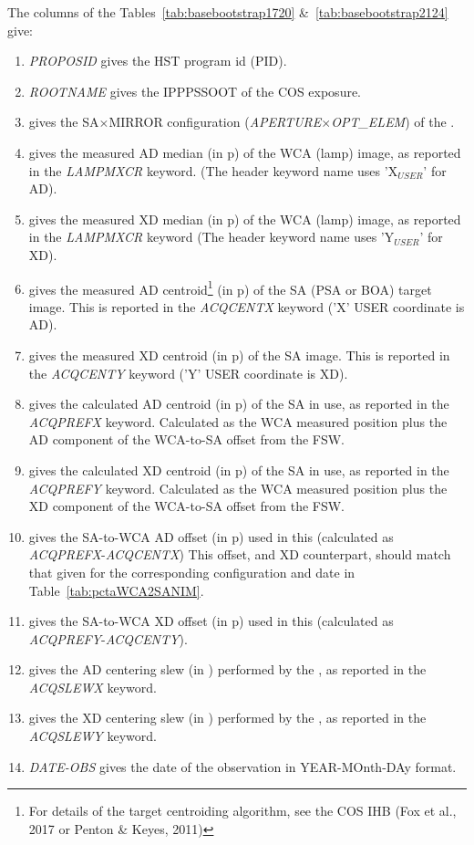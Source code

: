The columns of the Tables~\ref{tab:basebootstrap1720} \&~\ref{tab:basebootstrap2124} give:
\footnotesize
\begin{enumerate}
\item \textit{PROPOSID} gives the HST program id (PID).
\item \textit{ROOTNAME} gives the IPPPSSOOT of the COS exposure.
\item gives the SA$\times$MIRROR configuration (\textit{APERTURE}$\times$\textit{OPT\_ELEM}) of the .
\item gives the measured AD median (in p) of the WCA (lamp) image, as reported in the  \textit{LAMPMXCR} keyword.
(The header keyword name uses 'X$_{USER}$' for AD).
\item gives the measured XD median (in p) of the WCA (lamp) image, as reported in the \textit{LAMPMXCR} keyword (The header keyword name uses 'Y$_{USER}$' for XD).
\item gives the measured AD centroid\footnote{For details of the  target centroiding algorithm, see the COS IHB (Fox et al., 2017 or Penton \& Keyes, 2011)} (in p) of the SA (PSA or BOA) target image. This is reported in the \textit{ACQCENTX} keyword ('X' USER coordinate is AD).
\item gives the measured XD centroid (in p) of the SA image. This is reported in the \textit{ACQCENTY} keyword ('Y' USER coordinate is XD).
\item gives the calculated AD centroid (in p) of the SA in use, as reported in the \textit{ACQPREFX} keyword. Calculated as the WCA measured position plus the AD component of the WCA-to-SA offset from the FSW.
\item gives the calculated XD centroid (in p) of the SA in use, as reported in the \textit{ACQPREFY} keyword. Calculated as the WCA measured position plus the XD component of the WCA-to-SA offset from the FSW.
\item gives the SA-to-WCA AD offset (in p) used in this  (calculated as \textit{ACQPREFX}-\textit{ACQCENTX}) This offset, and XD counterpart, should match that given for the corresponding configuration and date in Table~\ref{tab:pctaWCA2SANIM}.
\item gives the SA-to-WCA XD offset (in p) used in this  (calculated as \textit{ACQPREFY}-\textit{ACQCENTY}).
\item gives the AD centering slew (in \arcsec) performed by the , as reported in the \textit{ACQSLEWX} keyword.
\item gives the XD centering slew (in \arcsec) performed by the , as reported in the \textit{ACQSLEWY} keyword.
\item \textit{DATE-OBS} gives the date of the observation in YEAR-MOnth-DAy format.
\end{enumerate}
\normalsize

